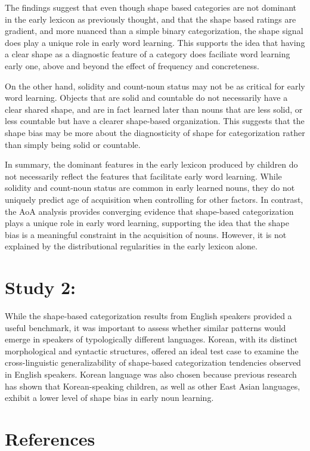 \documentclass[
  english,
  man]{apa6}
\begin{document}
The findings suggest that even though shape based categories are not dominant in the early lexicon as previously thought, and that the shape based ratings are gradient, and more nuanced than a simple binary categorization, the shape signal does play a unique role in early word learning. This supports the idea that having a clear shape as a diagnostic feature of a category does faciliate word learning early one, above and beyond the effect of frequency and concreteness.

On the other hand, solidity and count-noun status may not be as critical for early word learning. Objects that are solid and countable do not necessarily have a clear shared shape, and are in fact learned later than nouns that are less solid, or less countable but have a clearer shape-based organization. This suggests that the shape bias may be more about the diagnosticity of shape for categorization rather than simply being solid or countable.

In summary, the dominant features in the early lexicon produced by children do not necessarily reflect the features that facilitate early word learning. While solidity and count-noun status are common in early learned nouns, they do not uniquely predict age of acquisition when controlling for other factors. In contrast, the AoA analysis provides converging evidence that shape-based categorization plays a unique role in early word learning, supporting the idea that the shape bias is a meaningful constraint in the acquisition of nouns. However, it is not explained by the distributional regularities in the early lexicon alone.

\section{Study 2:}\label{study-2}

While the shape-based categorization results from English speakers provided a useful benchmark, it was important to assess whether similar patterns would emerge in speakers of typologically different languages. Korean, with its distinct morphological and syntactic structures, offered an ideal test case to examine the cross-linguistic generalizability of shape-based categorization tendencies observed in English speakers. Korean language was also chosen because previous research has shown that Korean-speaking children, as well as other East Asian languages, exhibit a lower level of shape bias in early noun learning.

\newpage

\section{References}\label{references}

\protect{}\label{refs}
\end{document}
